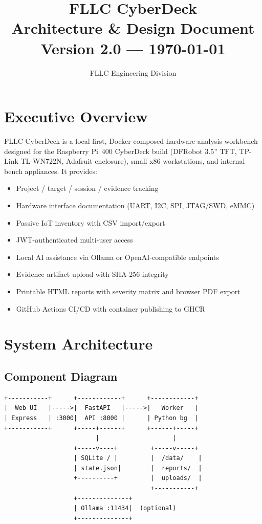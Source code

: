 \documentclass[11pt,a4paper]{article}
\title{%
  \vspace{-1cm}
  {\Huge\bfseries\textcolor{cyber}{FLLC CyberDeck}}\\[6pt]
  {\Large Architecture \& Design Document}\\[4pt]
  {\normalsize Version 2.0 --- \today}
}
\author{FLLC Engineering Division}
\date{}
\begin{document}
\maketitle
\thispagestyle{fancy}
\tableofcontents
\newpage

\section{Executive Overview}
FLLC CyberDeck is a local-first, Docker-composed hardware-analysis workbench
designed for the Raspberry Pi~400 CyberDeck build (DFRobot 3.5'' TFT,
TP-Link TL-WN722N, Adafruit enclosure), small x86 workstations, and internal bench
appliances.  It provides:
\begin{itemize}
  \item Project / target / session / evidence tracking
  \item Hardware interface documentation (UART, I2C, SPI, JTAG/SWD, eMMC)
  \item Passive IoT inventory with CSV import/export
  \item JWT-authenticated multi-user access
  \item Local AI assistance via Ollama or OpenAI-compatible endpoints
  \item Evidence artifact upload with SHA-256 integrity
  \item Printable HTML reports with severity matrix and browser PDF export
  \item GitHub Actions CI/CD with container publishing to GHCR
\end{itemize}

\section{System Architecture}

\subsection{Component Diagram}
\begin{verbatim}
+-----------+      +------------+      +------------+
|  Web UI   |----->|  FastAPI   |----->|   Worker   |
| Express   | :3000|  API :8000 |      | Python bg  |
+-----------+      +-----+------+      +------+-----+
                         |                    |
                   +-----v----+         +-----v-----+
                   | SQLite / |         |  /data/    |
                   | state.json|        |  reports/  |
                   +----------+         |  uploads/  |
                                        +-----------+
                   +--------------+
                   | Ollama :11434|  (optional)
                   +--------------+
\end{verbatim}
\end{document}
